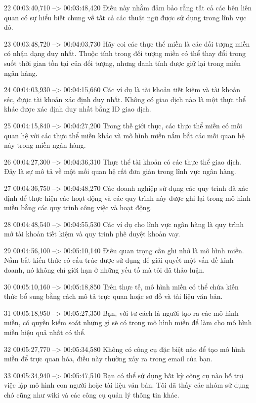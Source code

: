 22
00:03:40,710 --> 00:03:48,420
Điều này nhằm đảm bảo rằng tất cả các bên liên quan có sự hiểu biết chung về tất cả các thuật ngữ được sử dụng trong lĩnh vực đó.

23
00:03:48,720 --> 00:04:03,730
Hãy coi các thực thể miền là các đối tượng miền có nhận dạng duy nhất.  Thuộc tính trong đối tượng miền có thể thay đổi trong suốt thời gian tồn tại của đối tượng, nhưng danh tính được giữ lại trong miền ngân hàng.

24
00:04:03,930 --> 00:04:15,660
Các ví dụ là tài khoản tiết kiệm và tài khoản séc, được tài khoản xác định duy nhất.  Không có giao dịch nào là một thực thể khác được xác định duy nhất bằng ID giao dịch.

25
00:04:15,840 --> 00:04:27,200
Trong thế giới thực, các thực thể miền có mối quan hệ với các thực thể miền khác và mô hình miền nắm bắt các mối quan hệ này trong miền ngân hàng.

26
00:04:27,300 --> 00:04:36,310
Thực thể tài khoản có các thực thể giao dịch.  Đây là sự mô tả về một mối quan hệ rất đơn giản trong lĩnh vực ngân hàng.

27
00:04:36,750 --> 00:04:48,270
Các doanh nghiệp sử dụng các quy trình đã xác định để thực hiện các hoạt động và các quy trình này được ghi lại trong mô hình miền bằng các quy trình công việc và hoạt động.

28
00:04:48,540 --> 00:04:55,530
Các ví dụ cho lĩnh vực ngân hàng là quy trình mở tài khoản tiết kiệm và quy trình phê duyệt khoản vay.

29
00:04:56,100 --> 00:05:10,140
Điều quan trọng cần ghi nhớ là mô hình miền.  Nắm bắt kiến ​​thức có cấu trúc được sử dụng để giải quyết một vấn đề kinh doanh, nó không chỉ giới hạn ở những yếu tố mà tôi đã thảo luận.

30
00:05:10,160 --> 00:05:18,850
Trên thực tế, mô hình miền có thể chứa kiến ​​thức bổ sung bằng cách mô tả trực quan hoặc sơ đồ và tài liệu văn bản.

31
00:05:18,950 --> 00:05:27,350
Bạn, với tư cách là người tạo ra các mô hình miền, có quyền kiểm soát những gì sẽ có trong mô hình miền để làm cho mô hình miền hiệu quả nhất có thể.

32
00:05:27,770 --> 00:05:34,580
Không có công cụ đặc biệt nào để tạo mô hình miền để trực quan hóa, điều này thường xảy ra trong email của bạn.

33
00:05:34,940 --> 00:05:47,510
Bạn có thể sử dụng bất kỳ công cụ nào hỗ trợ việc lập mô hình con người hoặc tài liệu văn bản.  Tôi đã thấy các nhóm sử dụng chó cũng như wiki và các công cụ quản lý thông tin khác.

